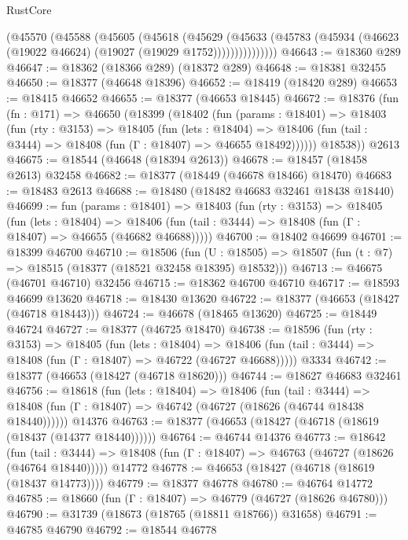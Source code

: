 \begin{lexlean}{RustCore}
\begin{coremodule}
            (@45570
              (@45588
                (@45605
                  (@45618
                    (@45629
                      (@45633
                        (@45783 (@45934 (@46623 (@19022 @46624) (@19027 (@19029 @1752)))))))))))))))
@46643 := @18360 @289
@46647 := @18362 (@18366 @289) (@18372 @289)
@46648 := @18381 @32455
@46650 := @18377 (@46648 @18396)
@46652 := @18419 (@18420 @289)
@46653 := @18415 @46652
@46655 := @18377 (@46653 @18445)
@46672 := @18376
    (fun (fn : @171) =>
    @46650
      (@18399
        (@18402
          (fun (params : @18401) =>
          @18403
            (fun (rty : @3153) =>
            @18405
              (fun (lets : @18404) =>
              @18406 (fun (tail : @3444) => @18408 (fun (Γ : @18407) => @46655 @18492))))))
        @18538))
    @2613
@46675 := @18544 (@46648 (@18394 @2613))
@46678 := @18457 (@18458 @2613) @32458
@46682 := @18377 (@18449 (@46678 @18466) @18470)
@46683 := @18483 @2613
@46688 := @18480 (@18482 @46683 @32461 @18438 @18440)
@46699 := fun (params : @18401) =>
  @18403
    (fun (rty : @3153) =>
    @18405
      (fun (lets : @18404) =>
      @18406 (fun (tail : @3444) => @18408 (fun (Γ : @18407) => @46655 (@46682 @46688)))))
@46700 := @18402 @46699
@46701 := @18399 @46700
@46710 := @18506
    (fun (U : @18505) => @18507 (fun (t : @7) => @18515 (@18377 (@18521 @32458 @18395) @18532)))
@46713 := @46675 (@46701 @46710) @32456
@46715 := @18362 @46700 @46710
@46717 := @18593 @46699 @13620
@46718 := @18430 @13620
@46722 := @18377 (@46653 (@18427 (@46718 @18443)))
@46724 := @46678 (@18465 @13620)
@46725 := @18449 @46724
@46727 := @18377 (@46725 @18470)
@46738 := @18596
    (fun (rty : @3153) =>
    @18405
      (fun (lets : @18404) =>
      @18406 (fun (tail : @3444) => @18408 (fun (Γ : @18407) => @46722 (@46727 @46688)))))
    @3334
@46742 := @18377 (@46653 (@18427 (@46718 @18620)))
@46744 := @18627 @46683 @32461
@46756 := @18618
    (fun (lets : @18404) =>
    @18406
      (fun (tail : @3444) =>
      @18408 (fun (Γ : @18407) => @46742 (@46727 (@18626 (@46744 @18438 @18440))))))
    @14376
@46763 := @18377 (@46653 (@18427 (@46718 (@18619 (@18437 (@14377 @18440))))))
@46764 := @46744 @14376
@46773 := @18642
    (fun (tail : @3444) => @18408 (fun (Γ : @18407) => @46763 (@46727 (@18626 (@46764 @18440)))))
    @14772
@46778 := @46653 (@18427 (@46718 (@18619 (@18437 @14773))))
@46779 := @18377 @46778
@46780 := @46764 @14772
@46785 := @18660 (fun (Γ : @18407) => @46779 (@46727 (@18626 @46780)))
@46790 := @31739 (@18673 (@18765 (@18811 @18766)) @31658)
@46791 := @46785 @46790
@46792 := @18544 @46778

\end{coremodule}
\end{lexlean}
